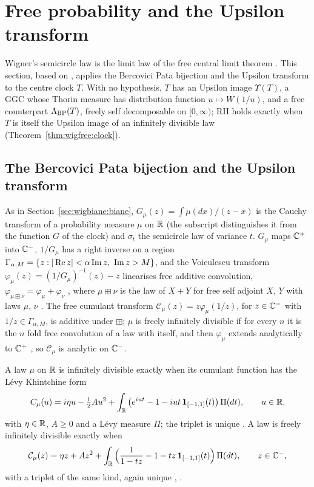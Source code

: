 \section{Free probability and the Upsilon transform}\label{sec:wigfree}

Wigner's semicircle law \cite{Wig58} is the limit law of the free central limit theorem \cite{Voi86,NS06}. This section, based on \cite{P26wig}, applies the Bercovici Pata bijection \cite{BP99} and the Upsilon transform \cite{BNT04,BNMS06} to the centre clock $T$. With no hypothesis, $T$ has an Upsilon image $\Upsilon(T)$, a GGC whose Thorin measure has distribution function $u\mapsto W(1/u)$, and a free counterpart $\Lambda_{\rm BP}(T)$, freely self decomposable on $[0,\infty)$; RH holds exactly when $T$ is itself the Upsilon image of an infinitely divisible law (Theorem~\ref{thm:wigfree:clock}).

\subsection{The Bercovici Pata bijection and the Upsilon transform}\label{sec:wigfree:bp}

As in Section~\ref{sec:wigbiane:biane}, $G_\mu(z)=\int\mu(dx)/(z-x)$ is the Cauchy transform of a probability measure $\mu$ on $\mathbb{R}$ (the subscript distinguishes it from the function $G$ of the clock) and $\sigma_t$ the semicircle law of variance $t$. $G_\mu$ maps $\mathbb{C}^+$ into $\mathbb{C}^-$, $1/G_\mu$ has a right inverse on a region $\Gamma_{\alpha,M}=\{z:|\operatorname{Re} z|<\alpha\operatorname{Im} z,\ \operatorname{Im} z>M\}$, and the Voiculescu transform $\varphi_\mu(z)=(1/G_\mu)^{-1}(z)-z$ linearises free additive convolution, $\varphi_{\mu\boxplus\nu}=\varphi_\mu+\varphi_\nu$ \cite{Voi86,BV93}, where $\mu\boxplus\nu$ is the law of $X+Y$ for free self adjoint $X$, $Y$ with laws $\mu$, $\nu$ \cite{NS06}. The free cumulant transform $\mathcal C_\mu(z)=z\varphi_\mu(1/z)$, for $z\in\mathbb{C}^-$ with $1/z\in\Gamma_{\alpha,M}$, is additive under $\boxplus$; $\mu$ is freely infinitely divisible if for every $n$ it is the $n$ fold free convolution of a law with itself, and then $\varphi_\mu$ extends analytically to $\mathbb{C}^+$ \cite{BV93}, so $\mathcal C_\mu$ is analytic on $\mathbb{C}^-$.

A law $\mu$ on $\mathbb{R}$ is infinitely divisible exactly when its cumulant function has the L\'evy Khintchine form
\begin{equation}\label{eq:wigfree:lk}
C_\mu(u)=i\eta u-\tfrac12Au^2+\int_{\mathbb{R}}\big(e^{iut}-1-iut\,\mathbf 1_{[-1,1]}(t)\big)\,\Pi(dt),\qquad u\in\mathbb{R},
\end{equation}
with $\eta\in\mathbb{R}$, $A\ge0$ and a L\'evy measure $\Pi$; the triplet is unique \cite[Theorem 8.1]{Sato99}. A law is freely infinitely divisible exactly when
\begin{equation}\label{eq:wigfree:freelk}
\mathcal C_\mu(z)=\eta z+Az^2+\int_{\mathbb{R}}\Big(\frac1{1-tz}-1-tz\,\mathbf 1_{[-1,1]}(t)\Big)\,\Pi(dt),\qquad z\in\mathbb{C}^-,
\end{equation}
with a triplet of the same kind, again unique \cite{BV93,BP99}, \cite[Proposition 6]{AHS13}.

